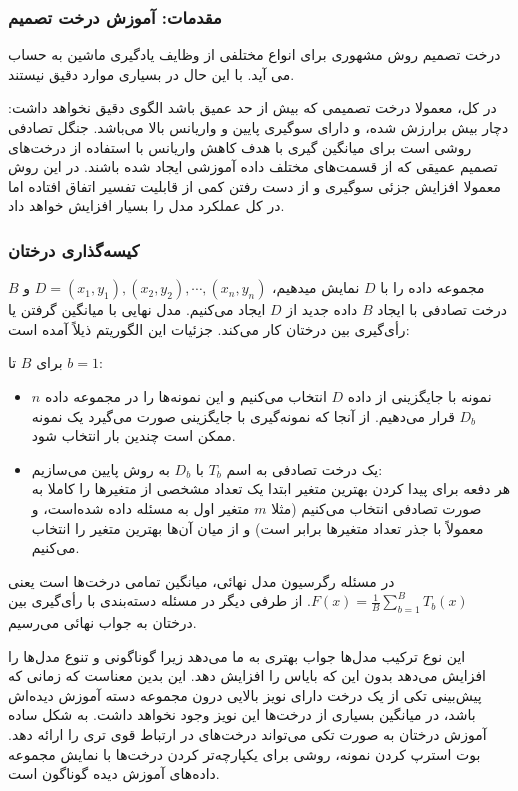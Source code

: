 \documentclass[12pt,a4paper,BCOR=.7cm,headsepline,bibliography=totoc]{report}
\begin{document}
\subsubsection{مقدمات: آموزش درخت تصمیم}
درخت تصمیم روش مشهوری برای انواع مختلفی از وظایف یادگیری ماشین به حساب می آید. با این حال در بسیاری موارد دقیق نیستند.

در کل، معمولا درخت تصمیمی که بیش از حد عمیق باشد الگوی دقیق نخواهد داشت: دچار بیش برارزش شده، و دارای سوگیری پایین و واریانس بالا می‌باشد. جنگل تصادفی روشی است برای میانگین گیری با هدف کاهش واریانس با استفاده از درخت‌های تصمیم عمیقی که از قسمت‌های مختلف داده آموزشی ایجاد شده باشند. در این روش معمولا افزایش جزئی سوگیری و از دست رفتن کمی از قابلیت تفسیر اتفاق افتاده اما در کل عملکرد مدل را بسیار افزایش خواهد داد.
\subsubsection{کیسه‌گذاری درختان}
مجموعه داده را با ${\displaystyle D}$ نمایش میدهیم، ${\displaystyle D=(x_{1},y_{1}),(x_{2},y_{2}),\cdots ,(x_{n},y_{n})}$ و ${\displaystyle B}$ درخت تصادفی با ایجاد ${\displaystyle B}$ داده جدید از ${\displaystyle D}$ ایجاد می‌کنیم. مدل نهایی با میانگین گرفتن یا رأی‌گیری بین درختان کار می‌کند. جزئیات این الگوریتم ذیلاً آمده است:‌

برای ${\displaystyle B}$ تا ${\displaystyle b=1}$:

\begin{itemize}
\item ${\displaystyle n}$
 نمونه با جایگزینی از داده ${\displaystyle D}$ انتخاب می‌کنیم و این نمونه‌ها را در مجموعه داده ${\displaystyle D_{b}}$ قرار می‌دهیم. از آنجا که نمونه‌گیری با جایگزینی صورت می‌گیرد یک نمونه ممکن است چندین بار انتخاب شود.
\item
 یک درخت تصادفی به اسم ${\displaystyle T_{b}}$ با ${\displaystyle D_{b}}$ به روش پایین می‌سازیم:\\
 هر دفعه برای پیدا کردن بهترین متغیر ابتدا یک تعداد مشخصی از متغیرها را کاملا به صورت تصادفی انتخاب می‌کنیم (مثلا ${\displaystyle m}$ متغیر اول به مسئله داده شده‌است، و معمولاً با جذر تعداد متغیرها برابر است) و از میان آن‌ها بهترین متغیر را انتخاب می‌کنیم.
\end{itemize}
در مسئله رگرسیون مدل نهائی، میانگین تمامی درخت‌ها است یعنی ${\displaystyle F(x)={\frac {1}{B}}\sum _{b=1}^{B}T_{b}(x)}$. از طرفی دیگر در مسئله دسته‌بندی با رأی‌گیری بین درختان به جواب نهائی می‌رسیم.

این نوع ترکیب مدل‌ها جواب بهتری به ما می‌دهد زیرا گوناگونی و تنوع مدل‌ها را افزایش می‌دهد بدون این که بایاس را افزایش دهد. این بدین معناست که زمانی که پیش‌بینی تکی از یک درخت دارای نویز بالایی درون مجموعه دسته آموزش دیده‌اش باشد، در میانگین بسیاری از درخت‌ها این نویز وجود نخواهد داشت. به شکل ساده آموزش درختان به صورت تکی می‌تواند درخت‌های در ارتباط قوی تری را ارائه دهد. بوت استرپ کردن نمونه، روشی برای یکپارچه‌تر کردن درخت‌ها با نمایش مجموعه داده‌های آموزش دیده گوناگون است.
\end{document}
